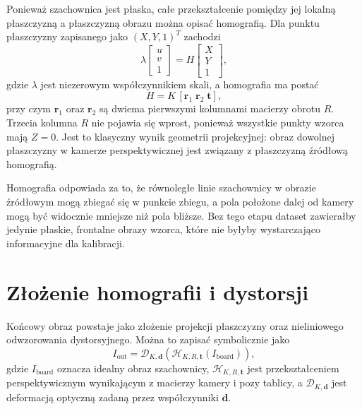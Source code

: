 \documentclass[12pt,a4paper]{report}
\begin{document}
Ponieważ szachownica jest płaska, całe przekształcenie pomiędzy jej lokalną płaszczyzną
a płaszczyzną obrazu można opisać homografią. Dla punktu płaszczyzny zapisanego jako
$(X,Y,1)^T$ zachodzi
\begin{equation}
    \lambda
    \begin{bmatrix}
        u \\
        v \\
        1
    \end{bmatrix}
    =
    H
    \begin{bmatrix}
        X \\
        Y \\
        1
    \end{bmatrix},
\end{equation}
gdzie $\lambda$ jest niezerowym współczynnikiem skali, a homografia ma postać
\begin{equation}
    H = K\,[\mathbf{r}_1\;\mathbf{r}_2\;\mathbf{t}],
\end{equation}
przy czym $\mathbf{r}_1$ oraz $\mathbf{r}_2$ są dwiema pierwszymi kolumnami macierzy obrotu
$R$. Trzecia kolumna $R$ nie pojawia się wprost, ponieważ wszystkie punkty wzorca mają
$Z=0$. Jest to klasyczny wynik geometrii projekcyjnej: obraz dowolnej płaszczyzny w kamerze
perspektywicznej jest związany z płaszczyzną źródłową homografią.

Homografia odpowiada za to, że równoległe linie szachownicy w obrazie źródłowym mogą zbiegać
się w punkcie zbiegu, a pola położone dalej od kamery mogą być widocznie mniejsze niż pola
bliższe. Bez tego etapu dataset zawierałby jedynie płaskie, frontalne obrazy wzorca, które
nie byłyby wystarczająco informacyjne dla kalibracji.

\section{Złożenie homografii i dystorsji}
Końcowy obraz powstaje jako złożenie projekcji płaszczyzny oraz nieliniowego odwzorowania
dystorsyjnego. Można to zapisać symbolicznie jako
\begin{equation}
    I_{\text{out}} = \mathcal{D}_{K,\mathbf{d}}\left(\mathcal{H}_{K,R,\mathbf{t}}(I_{\text{board}})\right),
\end{equation}
gdzie $I_{\text{board}}$ oznacza idealny obraz szachownicy, $\mathcal{H}_{K,R,\mathbf{t}}$
jest przekształceniem perspektywicznym wynikającym z macierzy kamery i pozy tablicy,
a $\mathcal{D}_{K,\mathbf{d}}$ jest deformacją optyczną zadaną przez współczynniki
$\mathbf{d}$.
\end{document}
